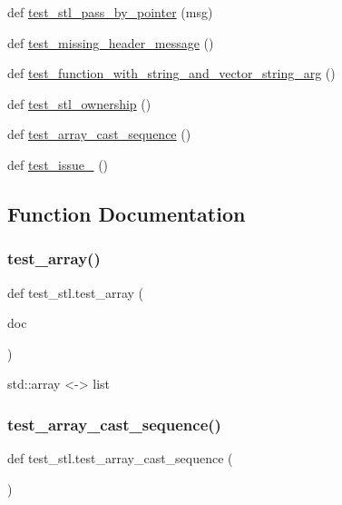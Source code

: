 \begin{DoxyCompactItemize}
def \mbox{\hyperlink{namespacetest__stl_ad34d2165b825e5f9f29bf7805f14dca5}{test\+\_\+stl\+\_\+pass\+\_\+by\+\_\+pointer}} (msg)
\item 
def \mbox{\hyperlink{namespacetest__stl_a9d6f87058ec1fc4434894da14013942c}{test\+\_\+missing\+\_\+header\+\_\+message}} ()
\item 
def \mbox{\hyperlink{namespacetest__stl_a7468ccf8a298b8d4562096923b90f314}{test\+\_\+function\+\_\+with\+\_\+string\+\_\+and\+\_\+vector\+\_\+string\+\_\+arg}} ()
\item 
def \mbox{\hyperlink{namespacetest__stl_a5fa652434f62df731621b390751b09a8}{test\+\_\+stl\+\_\+ownership}} ()
\item 
def \mbox{\hyperlink{namespacetest__stl_af742762a88ef587bdeff28091a9daee7}{test\+\_\+array\+\_\+cast\+\_\+sequence}} ()
\item 
def \mbox{\hyperlink{namespacetest__stl_a37b0afa403d8104ad0f9b51a976bd059}{test\+\_\+issue\+\_}} ()
\end{DoxyCompactItemize}


\subsection{Function Documentation}
\mbox{\label{namespacetest__stl_a4130bb835654765446af66d1279fd15f}} 
\subsubsection{\texorpdfstring{test\_array()}{test\_array()}}
{\footnotesize\ttfamily def test\+\_\+stl.\+test\+\_\+array (\begin{DoxyParamCaption}\item[{}]{doc }\end{DoxyParamCaption})}

\begin{DoxyVerb}std::array <-> list\end{DoxyVerb}
 \mbox{\label{namespacetest__stl_af742762a88ef587bdeff28091a9daee7}} 
\subsubsection{\texorpdfstring{test\_array\_cast\_sequence()}{test\_array\_cast\_sequence()}}
{\footnotesize\ttfamily def test\+\_\+stl.\+test\+\_\+array\+\_\+cast\+\_\+sequence (\begin{DoxyParamCaption}{ }\end{DoxyParamCaption})}

